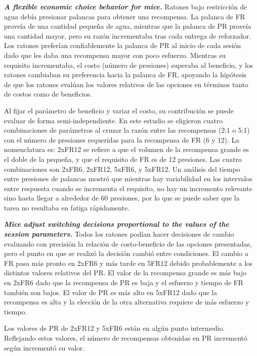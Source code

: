 \documentclass[a4paper,12pt]{article}
\begin{document}
{\itshape\bfseries A flexible economic choice behavior for mice.} Ratones bajo restricción de agua debía presionar palancas para obtener una recompensa. La palanca de FR proveía de una cantidad pequeña de agua, mientras que la palanca de PR proveía una cantidad mayor, pero su razón incrementaba tras cada entrega de reforzador. Los ratones preferían confiablemente la palanca de PR al inicio de cada sesión dado que les daba una recompensa mayor con poco esfuerzo. Mientras su requisito incrementaba, el costo (número de presiones) superaba al beneficio, y los ratones cambiaban su preferencia hacia la palanca de FR, apoyando la hipótesis de que los ratones evalúan los valores relativos de las opciones en términos tanto de costos como de beneficios.

Al fijar el parámetro de beneficio y variar el costo, su contribución se puede evaluar de forma semi-independiente. En este estudio se eligieron cuatro combinaciones de parámetros al cruzar la razón entre las recompensas (2:1 o 5:1) con el número de presiones requeridas para la recompensa de FR (6 y 12). La nomenclatura es: 2xFR12 se refiere a que el volumen de la recompensa grande es el doble de la pequeña, y que el requisito de FR es  de 12 presiones. Las cuatro combinaciones son 2xFR6, 2xFR12, 5xFR6, y 5xFR12. Un análisis del tiempo entre presiones de palancas mostró que mientras hay variabilidad en los intervalos entre respuesta cuando se incrementa el requisito, no hay un incremento relevante sino hasta llegar a alrededor de 60 presiones, por lo que se puede saber que la tarea no resultaba en fatiga rápidamente.

{\itshape\bfseries Mice adjust switching decisions proportional to the values of the session parameters.} Todos los ratones podían hacer decisiones de cambio  evaluando con precisión la relación de costo-beneficio de las opciones presentadas, pero el punto en que se realizó la decisión cambió entre condiciones. El cambio a FR pasa más pronto en 2xFR6 y más tarde en 5FR12 debido probablemente a los distintos valores relativos del PR. El valor de la recompensa grande es más bajo en 2xFR6 dado que la recompensa de PR es baja y el esfuerzo y tiempo de FR también son bajos. El valor de PR es más alto en 5xFR12 dado que la recompensa es alta y la elección de la otra alternativa requiere de más esfuerzo y tiempo. 

Los valores de PR de 2xFR12 y 5xFR6 están en algún punto intermedio. Reflejando estos valores, el número de recompensas obtenidas en PR incrementó según incrementó su valor.
\end{document}
